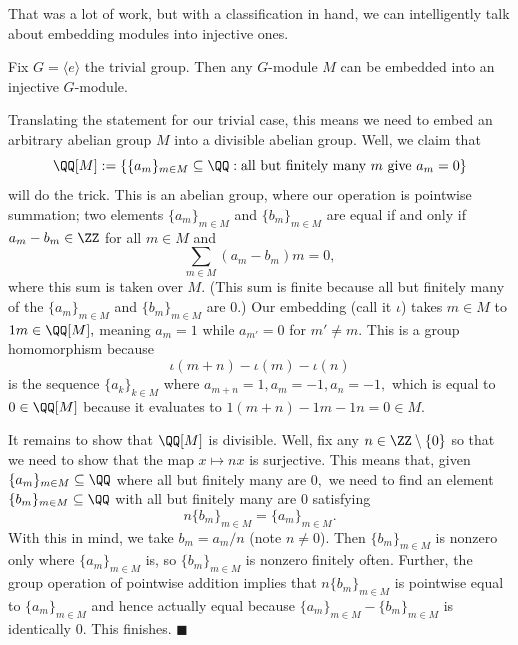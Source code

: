 That was a lot of work, but with a classification in hand, we can intelligently talk about embedding modules into injective ones.
\begin{lemma}
    Fix $G=\langle e\rangle$ the trivial group. Then any $G$-module $M$ can be embedded into an injective $G$-module.
\end{lemma}
Translating the statement for our trivial case, this means we need to embed an arbitrary abelian group $M$ into a divisible abelian group. Well, we claim that
\[\QQ[M]:=\left\{\{a_m\}_{m\in M}\subseteq\QQ:\text{all but finitely many }m\text{ give }a_m=0\right\}\]
will do the trick. This is an abelian group, where our operation is pointwise summation; two elements $\{a_m\}_{m\in M}$ and $\{b_m\}_{m\in M}$ are equal if and only if $a_m-b_m\in\ZZ$ for all $m\in M$ and
\[\sum_{m\in M}(a_m-b_m)m=0,\]
where this sum is taken over $M.$ (This sum is finite because all but finitely many of the $\{a_m\}_{m\in M}$ and $\{b_m\}_{m\in M}$ are $0.$) Our embedding (call it $\iota$) takes $m\in M$ to $1m\in\QQ[M],$ meaning $a_m=1$ while $a_{m'}=0$ for $m'\ne m.$ This is a group homomorphism because
\[\iota(m+n)-\iota(m)-\iota(n)\]
is the sequence $\{a_k\}_{k\in M}$ where $a_{m+n}=1,a_m=-1,a_n=-1,$ which is equal to $0\in\QQ[M]$ because it evaluates to $1(m+n)-1m-1n=0\in M.$

It remains to show that $\QQ[M]$ is divisible. Well, fix any $n\in\ZZ\setminus\{0\}$ so that we need to show that the map $x\mapsto nx$ is surjective. This means that, given $\{a_m\}_{m\in M}\subseteq\QQ$ where all but finitely many are $0,$ we need to find an element $\{b_m\}_{m\in M}\subseteq\QQ$ with all but finitely many are $0$ satisfying
\[n\{b_m\}_{m\in M}=\{a_m\}_{m\in M}.\]
With this in mind, we take $b_m=a_m/n$ (note $n\ne0$). Then $\{b_m\}_{m\in M}$ is nonzero only where $\{a_m\}_{m\in M}$ is, so $\{b_m\}_{m\in M}$ is nonzero finitely often. Further, the group operation of pointwise addition implies that $n\{b_m\}_{m\in M}$ is pointwise equal to $\{a_m\}_{m\in M}$ and hence actually equal because $\{a_m\}_{m\in M}-\{b_m\}_{m\in M}$ is identically $0.$ This finishes. $\blacksquare$

